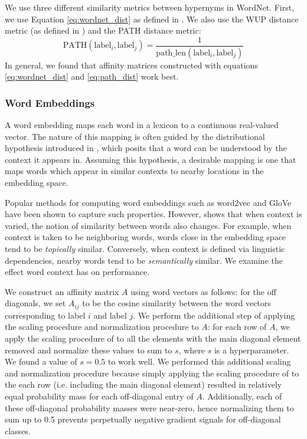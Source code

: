 We use three different similarity metrics between hypernyms in WordNet.
First, we use Equation \ref{eq:wordnet_dist} as defined in \cite{zhao2011large}.
We also use the WUP distance metric (as defined in
\cite{budanitsky2006evaluating}) and the PATH distance metric:
\begin{equation}
\label{eq:path_dist}
\mathrm{PATH}(\mathrm{label}_i, \mathrm{label}_j) =
  \frac{1}{\mathrm{path\_len}(\mathrm{label}_i, \mathrm{label}_j)}
\end{equation}
In general, we found that affinity matrices constructed with equations
\ref{eq:wordnet_dist} and \ref{eq:path_dist} work best.


\subsubsection{Word Embeddings} \label{word2vec}

A word embedding maps each word in a lexicon to a continuous
real-valued vector. The nature of this mapping is often guided by the
distributional hypothesis introduced in
\cite{harris1954distributional}, which posits that a word can be
understood by the context it appears in. Assuming this hypothesis, a
desirable mapping is one that maps words which appear in similar
contexts to nearby locations in the embedding space.

Popular methods for computing word embeddings such as word2vec
\cite{mikolov2013distributed} and GloVe \cite{pennington2014glove} have been
shown to capture such properties.  However, \cite{levy2014dependency} shows that
when context is varied, the notion of similarity between words also changes. For
example, when context is taken to be neighboring words, words close in the
embedding space tend to be \emph{topically} similar. Conversely, when context is
defined via linguistic dependencies, nearby words tend to be \emph{semantically}
similar. We examine the effect word context has on performance.

We construct an affinity matrix $A$ using word vectors as follows: for
the off diagonals, we set $A_{ij}$ to be the cosine similarity between the word
vectors corresponding to label $i$ and label $j$. We perform the additional step
of applying the scaling procedure and normalization procedure to $A$: for each
row of $A$, we apply the scaling procedure of \cite{zhao2011large} to all the
elements with the main diagonal element removed and normalize these values to
sum to $s$, where $s$ is a hyperparameter. We found a value of $s = 0.5$ to work
well.  We performed this additional scaling and normalization procedure because
simply applying the scaling procedure of \cite{zhao2011large} to the each row
(i.e.  including the main diagonal element) resulted in relatively equal
probability mass for each off-diagonal entry of $A$. Additionally, each of these
off-diagonal probability masses were near-zero, hence normalizing them to sum up
to 0.5 prevents perpetually negative gradient signals for off-diagonal classes.

